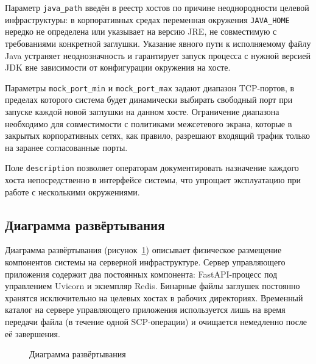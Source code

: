 Параметр \texttt{java\_path} введён в реестр хостов по причине неоднородности целевой инфраструктуры: в корпоративных средах переменная окружения \texttt{JAVA\_HOME} нередко не определена или указывает на версию JRE, не совместимую с требованиями конкретной заглушки. Указание явного пути к исполняемому файлу Java устраняет неоднозначность и гарантирует запуск процесса с нужной версией JDK вне зависимости от конфигурации окружения на хосте.

Параметры \texttt{mock\_port\_min} и \texttt{mock\_port\_max} задают диапазон TCP-портов, в пределах которого система будет динамически выбирать свободный порт при запуске каждой новой заглушки на данном хосте. Ограничение диапазона необходимо для совместимости с политиками межсетевого экрана, которые в закрытых корпоративных сетях, как правило, разрешают входящий трафик только на заранее согласованные порты.

Поле \texttt{description} позволяет операторам документировать назначение каждого хоста непосредственно в интерфейсе системы, что упрощает эксплуатацию при работе с несколькими окружениями.

\subsection{Диаграмма развёртывания}

Диаграмма развёртывания (рисунок~\ref{fig:deployment}) описывает физическое размещение компонентов системы на серверной инфраструктуре. Сервер управляющего приложения содержит два постоянных компонента: FastAPI-процесс под управлением Uvicorn и экземпляр Redis. Бинарные файлы заглушек постоянно хранятся исключительно на целевых хостах в рабочих директориях. Временный каталог на сервере управляющего приложения используется лишь на время передачи файла (в течение одной SCP-операции) и очищается немедленно после её завершения.

\begin{figure}[H]
\centering
\caption{Диаграмма развёртывания}
\label{fig:deployment}
\end{figure}




